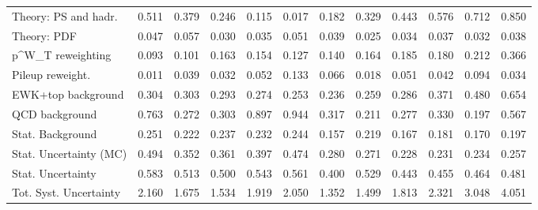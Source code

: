 \begin{tabular}{l|p{0.6cm}p{0.6cm}p{0.6cm}p{0.6cm}p{0.6cm}p{0.6cm}p{0.6cm}p{0.6cm}p{0.6cm}p{0.6cm}p{0.6cm}}
Theory: PS and hadr.                     & 0.511 & 0.379 & 0.246 & 0.115 & 0.017 & 0.182 & 0.329 & 0.443 & 0.576 & 0.712 & 0.850 \\
Theory: PDF                              & 0.047 & 0.057 & 0.030 & 0.035 & 0.051 & 0.039 & 0.025 & 0.034 & 0.037 & 0.032 & 0.038 \\
p^{W}_{T} reweighting                    & 0.093 & 0.101 & 0.163 & 0.154 & 0.127 & 0.140 & 0.164 & 0.185 & 0.180 & 0.212 & 0.366 \\
Pileup reweight.                         & 0.011 & 0.039 & 0.032 & 0.052 & 0.133 & 0.066 & 0.018 & 0.051 & 0.042 & 0.094 & 0.034 \\
EWK+top background                       & 0.304 & 0.303 & 0.293 & 0.274 & 0.253 & 0.236 & 0.259 & 0.286 & 0.371 & 0.480 & 0.654 \\
QCD background                           & 0.763 & 0.272 & 0.303 & 0.897 & 0.944 & 0.317 & 0.211 & 0.277 & 0.330 & 0.197 & 0.567 \\
Stat. Background                         & 0.251 & 0.222 & 0.237 & 0.232 & 0.244 & 0.157 & 0.219 & 0.167 & 0.181 & 0.170 & 0.197 \\
Stat. Uncertainty (MC)                   & 0.494 & 0.352 & 0.361 & 0.397 & 0.474 & 0.280 & 0.271 & 0.228 & 0.231 & 0.234 & 0.257 \\
\hline
Stat. Uncertainty                        & 0.583 & 0.513 & 0.500 & 0.543 & 0.561 & 0.400 & 0.529 & 0.443 & 0.455 & 0.464 & 0.481 \\
\hline
Tot. Syst. Uncertainty                   & 2.160 & 1.675 & 1.534 & 1.919 & 2.050 & 1.352 & 1.499 & 1.813 & 2.321 & 3.048 & 4.051 \\
\hline
\end{tabular}
